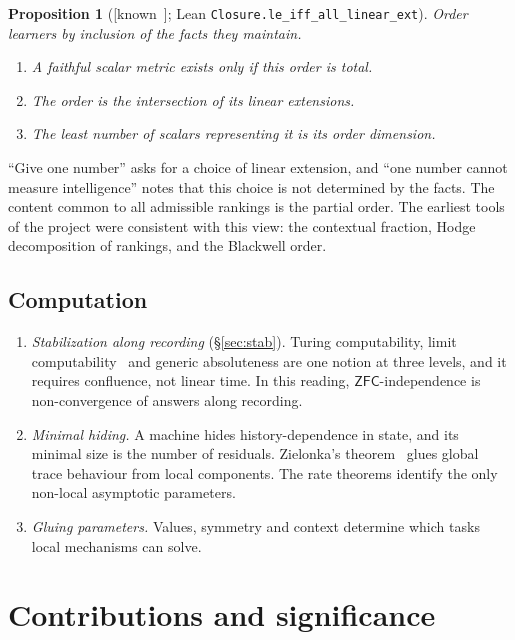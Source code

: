 \documentclass[11pt]{article}
\newtheorem{proposition}[theorem]{Proposition}
\theoremstyle{definition}
\theoremstyle{remark}
\newcommand{\ZFC}{\mathsf{ZFC}}
\newcommand{\lean}[1]{\texttt{#1}}
\newcommand{\status}[1]{\textsf{[#1]}}
\begin{document}
\begin{proposition}[\status{known~\cite{Szpilrajn30,DushnikMiller41,Debreu54}}; Lean \lean{Closure.le\_iff\_all\_linear\_ext}]
Order learners by inclusion of the facts they maintain.
\begin{enumerate}
\item A faithful scalar metric exists only if this order is total.
\item The order is the intersection of its linear extensions.
\item The least number of scalars representing it is its order dimension.
\end{enumerate}
\end{proposition}

\noindent ``Give one number'' asks for a choice of linear extension, and ``one number cannot measure intelligence'' notes that this choice is not determined by the facts. The content common to all admissible rankings is the partial order. The earliest tools of the project were consistent with this view: the contextual fraction, Hodge decomposition of rankings, and the Blackwell order.

\subsection{Computation}
\begin{enumerate}
\item \emph{Stabilization along recording} (\S\ref{sec:stab}). Turing computability, limit computability~\cite{Gold65,Putnam65} and generic absoluteness are one notion at three levels, and it requires confluence, not linear time. In this reading, $\ZFC$-independence is non-convergence of answers along recording.
\item \emph{Minimal hiding.} A machine hides history-dependence in state, and its minimal size is the number of residuals. Zielonka's theorem~\cite{Zielonka87} glues global trace behaviour from local components. The rate theorems identify the only non-local asymptotic parameters.
\item \emph{Gluing parameters.} Values, symmetry and context determine which tasks local mechanisms can solve.
\end{enumerate}

\section{Contributions and significance}\label{sec:contrib}
\end{document}
